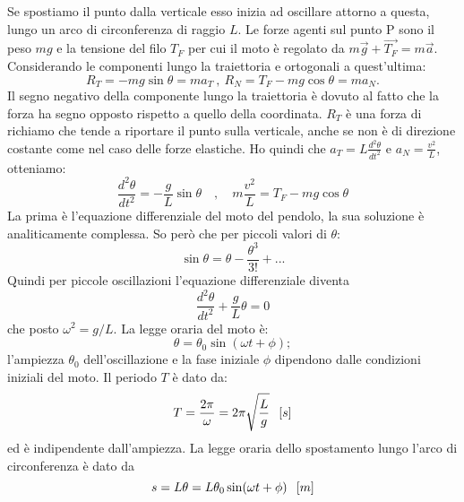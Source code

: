 \documentclass[class=book, crop=false, oneside, 12pt]{standalone}
\begin{document}
Se spostiamo il punto dalla verticale esso inizia ad oscillare attorno a questa, lungo un arco di circonferenza di raggio \(L\).
Le forze agenti sul punto P sono il peso \( m g\) e la tensione del filo \(T_F\) per cui il moto è regolato da \(m \overrightarrow{g} + \overrightarrow{T_F} = m \overrightarrow{a}\).
Considerando le componenti lungo la traiettoria e ortogonali a quest'ultima:
\begin{equation*}
    R_T = -mg \sin \theta = m a_T \ , \ R_N = T_F - mg \cos \theta = m a_N .
\end{equation*}
Il segno negativo della componente lungo la traiettoria è dovuto al fatto che  la forza ha segno opposto rispetto a quello della coordinata.
\(R_T\) è una forza di richiamo che tende a riportare il punto sulla verticale, anche se non è di direzione costante come nel caso delle forze elastiche.\newline
Ho quindi che \(a_T = L \frac {d^2 \theta} {dt^2}\) e \(a_N = \frac {v^2}{L}\), otteniamo:
\begin{equation*}
    \frac{d^{2} \theta}{d t^{2}}=-\frac{g}{L} \sin \theta \quad, \quad m \frac{v^{2}}{L}=T_{F}-m g \cos \theta
\end{equation*}
La prima è l'equazione differenziale del moto del pendolo, la sua soluzione è analiticamente complessa.
So però che per piccoli valori di \(\theta\):
\begin{equation*}
    \sin \theta = \theta - \frac {\theta^3} {3!} + ...
\end{equation*}
Quindi per piccole oscillazioni l'equazione differenziale diventa
\begin{equation*}
    \frac{d^2 \theta}{dt^2} + \frac{g}{L} \theta = 0
\end{equation*}
che posto \(\omega^2 = g/L\).\newline
La legge oraria del moto è:
\begin{equation}
    \theta = \theta_0 \sin (\omega t + \phi) ; 
\end{equation}
l'ampiezza \(\theta_0\) dell'oscillazione e la fase iniziale \(\phi\) dipendono dalle condizioni iniziali del moto.\newline
Il periodo \(T\) è dato da:
\begin{equation}
    T = \frac{2 \pi}{ \omega} = 2 \pi \sqrt{\frac{L}{g}} \hspace{0.2cm} \left[s\right]
\end{equation}
ed è indipendente dall'ampiezza.\newline
La legge oraria dello spostamento lungo l'arco di circonferenza è dato da
\begin{equation*}
    s = L \theta = L \theta_0 \sin (\omega t + \phi) \hspace{0.2cm} \left[m\right]
\end{equation*}
\end{document}
